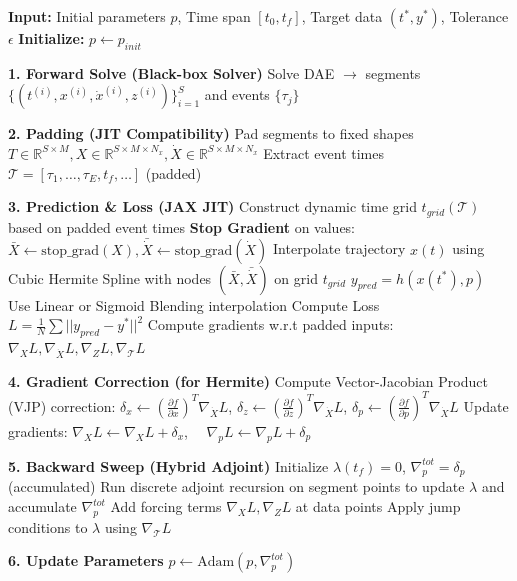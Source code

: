 \documentclass{article}
\begin{document}
\begin{algorithm}
\caption{Sensitivity-Independent DAE Optimization with Hermite Interpolation}
\begin{algorithmic}[1]
\State \textbf{Input:} Initial parameters $p$, Time span $[t_0, t_f]$, Target data $(t^*, y^*)$, Tolerance $\epsilon$
\State \textbf{Initialize:} $p \leftarrow p_{init}$

    \State \textbf{1. Forward Solve (Black-box Solver)}
    \State Solve DAE $\to$ segments $\{ (t^{(i)}, x^{(i)}, \dot{x}^{(i)}, z^{(i)}) \}_{i=1}^S$ and events $\{ \tau_j \}$
    
    \State \textbf{2. Padding (JIT Compatibility)}
    \State Pad segments to fixed shapes $T \in \mathbb{R}^{S \times M}, X \in \mathbb{R}^{S \times M \times N_x}, \dot{X} \in \mathbb{R}^{S \times M \times N_x}$
    \State Extract event times $\mathcal{T} = [\tau_1, \dots, \tau_E, t_f, \dots]$ (padded)
    
    \State \textbf{3. Prediction \& Loss (JAX JIT)}
        \State Construct dynamic time grid $t_{grid}(\mathcal{T})$ based on padded event times
        \State \textbf{Stop Gradient} on values: $\bar{X} \leftarrow \text{stop\_grad}(X), \bar{\dot{X}} \leftarrow \text{stop\_grad}(\dot{X})$
        \State Interpolate trajectory $x(t)$ using Cubic Hermite Spline with nodes $(\bar{X}, \bar{\dot{X}})$ on grid $t_{grid}$
        \State $y_{pred} = h(x(t^*), p)$
    \Else
        \State Use Linear or Sigmoid Blending interpolation
    \EndIf
    \State Compute Loss $L = \frac{1}{N} \sum ||y_{pred} - y^*||^2$
    \State Compute gradients w.r.t padded inputs: $\nabla_X L, \nabla_{\dot{X}} L, \nabla_Z L, \nabla_{\mathcal{T}} L$ 
    
    \State \textbf{4. Gradient Correction (for Hermite)}
        \State Compute Vector-Jacobian Product (VJP) correction:
        \State $\delta_x \leftarrow (\frac{\partial f}{\partial x})^T \nabla_{\dot{X}} L$, \quad $\delta_z \leftarrow (\frac{\partial f}{\partial z})^T \nabla_{\dot{X}} L$, \quad $\delta_p \leftarrow (\frac{\partial f}{\partial p})^T \nabla_{\dot{X}} L$
        \State Update gradients: $\nabla_X L \leftarrow \nabla_X L + \delta_x$, $\quad \nabla_p L \leftarrow \nabla_p L + \delta_p$
    \EndIf
    
    \State \textbf{5. Backward Sweep (Hybrid Adjoint)}
    \State Initialize $\lambda(t_f) = 0$, $\nabla_p^{tot} = \delta_p$ (accumulated)
        \State Run discrete adjoint recursion on segment points to update $\lambda$ and accumulate $\nabla_p^{tot}$
        \State Add forcing terms $\nabla_X L, \nabla_Z L$ at data points
            \State Apply jump conditions to $\lambda$ using $\nabla_{\mathcal{T}} L$
        \EndIf
    \EndFor
    
    \State \textbf{6. Update Parameters}
    \State $p \leftarrow \text{Adam}(p, \nabla_p^{tot})$
\EndWhile

\end{algorithmic}
\end{algorithm}
\end{document}
